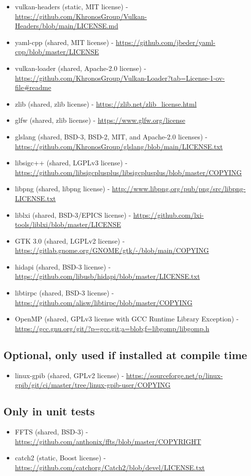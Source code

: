 \begin{itemize}
\item vulkan-headers (static, MIT license) - \url{https://github.com/KhronosGroup/Vulkan-Headers/blob/main/LICENSE.md}
\item yaml-cpp (shared, MIT license) - \url{https://github.com/jbeder/yaml-cpp/blob/master/LICENSE}
\item vulkan-loader (shared, Apache-2.0 license) - \url{https://github.com/KhronosGroup/Vulkan-Loader?tab=License-1-ov-file#readme}
\item zlib (shared, zlib license) - \url{https://zlib.net/zlib_license.html}
\item glfw (shared, zlib license) - \url{https://www.glfw.org/license}
\item glslang (shared, BSD-3, BSD-2, MIT, and Apache-2.0 licenses) - \url{https://github.com/KhronosGroup/glslang/blob/main/LICENSE.txt}
\item libsigc++ (shared, LGPLv3 license) - \url{https://github.com/libsigcplusplus/libsigcplusplus/blob/master/COPYING}
\item libpng (shared, libpng license) - \url{http://www.libpng.org/pub/png/src/libpng-LICENSE.txt}
\item liblxi (shared, BSD-3/EPICS license) - \url{https://github.com/lxi-tools/liblxi/blob/master/LICENSE}
\item GTK 3.0 (shared, LGPLv2 license) - \url{https://gitlab.gnome.org/GNOME/gtk/-/blob/main/COPYING}
\item hidapi (shared, BSD-3 license) - \url{https://github.com/libusb/hidapi/blob/master/LICENSE.txt}
\item libtirpc (shared, BSD-3 license) - \url{https://github.com/alisw/libtirpc/blob/master/COPYING}
\item OpenMP (shared, GPLv3 license with GCC Runtime Library Exception) - \url{https://gcc.gnu.org/git/?p=gcc.git;a=blob;f=libgomp/libgomp.h}
\end{itemize}

\subsection{Optional, only used if installed at compile time}
\begin{itemize}
\item linux-gpib (shared, GPLv2 license) - \url{https://sourceforge.net/p/linux-gpib/git/ci/master/tree/linux-gpib-user/COPYING}
\end{itemize}

\subsection{Only in unit tests}
\begin{itemize}
\item FFTS (shared, BSD-3) - \url{https://github.com/anthonix/ffts/blob/master/COPYRIGHT}
\item catch2 (static, Boost license) - \url{https://github.com/catchorg/Catch2/blob/devel/LICENSE.txt}
\end{itemize}
